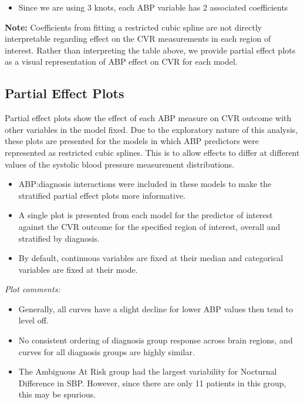 \documentclass[10pt]{article}\usepackage[]{graphicx}\usepackage[]{color}
\begin{document}
\begin{itemize}
  \item Since we are using 3 knots, each ABP variable has 2 associated coefficients
\end{itemize}

{\bf Note:} Coefficients from fitting a restricted cubic spline are not directly interpretable regarding effect on the CVR measurements in each region of interest. Rather than interpreting the table above, we provide partial effect plots as a visual representation of ABP effect on CVR for each model.
  





\clearpage
\subsection{Partial Effect Plots}
\label{sec:PEP}
Partial effect plots show the effect of each ABP measure on CVR outcome with other variables in the model fixed. Due to the exploratory nature of this analysis, these plots are presented for the models in which ABP predictors were represented as restricted cubic splines. This is to allow effects to differ at different values of the systolic blood pressure measurement distributions.\\

\begin{itemize}
  \item ABP:diagnosis interactions were included in these models to make the stratified partial effect plots more informative.
  \item A single plot is presented from each model for the predictor of interest against the CVR outcome for the specified region of interest, overall and stratified by diagnosis.
  \item By default, continuous variables are fixed at their median and categorical variables are fixed at their mode.
\end{itemize}
{\it Plot comments:}
\begin{itemize}
  \item Generally, all curves have a slight decline for lower ABP values then tend to level off.
  \item No consistent ordering of diagnosis group response across brain regions, and curves for all diagnosis groups are highly similar.
  \item The Ambiguous At Risk group had the largest variability for Nocturnal Difference in SBP. However, since there are only 11 patients in this group, this may be spurious.
\end{itemize}
\end{document}
